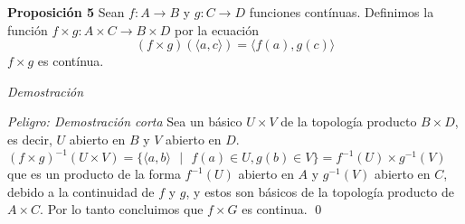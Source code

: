 \documentclass[]{article}
\begin{document}
\textbf{Proposición 5} Sean $f:A\rightarrow B$ y $g:C\rightarrow D$ funciones contínuas. Definimos la función $f\times g:A\times C\rightarrow B\times D$ por la ecuación $$(f\times g)(\langle a,c\rangle )=\langle f(a),g(c)\rangle $$  $f\times g$ es contínua.

\textit{Demostración}

\emph{Peligro: Demostración corta}
Sea un básico $U \times V $ de la topología producto $ B \times D $, es decir, $ U $ abierto en $B$ y $V$ abierto en $D$. $(f\times g)^{-1}(U\times V)=\{\langle a,b\rangle \text{ } |\text{ }f(a)\in U,g(b)\in V\}=f^{-1}(U)\times g^{-1}(V)$ que es un producto de la forma $f^{-1}(U)  $ abierto en $A$ y $ g^{-1}(V)$ abierto en $C$, debido a la continuidad de $f$ y $g$, y estos son básicos de la topología producto de  $A\times C$. Por lo tanto concluimos que $ f \times G $ es continua. \qed
\end{document}
